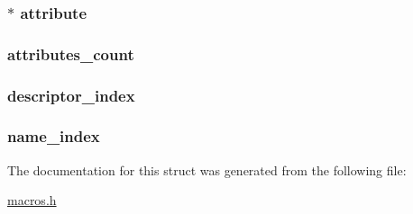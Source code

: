\subsubsection[{attribute}]{$\ast$ attribute}\label{structmethod__info_a6f532dd7d830de037d40199f21a548b7}
\hypertarget{structmethod__info_aa53122439ee827a418258d52c51368c6}{}
\subsubsection[{attributes\+\_\+count}]{ attributes\+\_\+count}\label{structmethod__info_aa53122439ee827a418258d52c51368c6}
\hypertarget{structmethod__info_a3f13794b6c8b4ffc87b87a7c01a69060}{}
\subsubsection[{descriptor\+\_\+index}]{ descriptor\+\_\+index}\label{structmethod__info_a3f13794b6c8b4ffc87b87a7c01a69060}
\hypertarget{structmethod__info_ae939ac3ca00f5727beaa02d0e339183d}{}
\subsubsection[{name\+\_\+index}]{ name\+\_\+index}\label{structmethod__info_ae939ac3ca00f5727beaa02d0e339183d}


The documentation for this struct was generated from the following file\+:\begin{DoxyCompactItemize}
\item 
\hyperlink{macros_8h}{macros.\+h}\end{DoxyCompactItemize}
